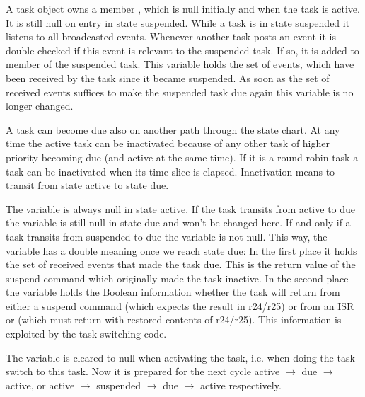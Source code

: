 
A task object owns a member , which is null
initially and when the task is active. It is still null on entry in state
suspended. While a task is in state suspended it listens to all
broadcasted events. Whenever another task posts an event it is
double-checked if this event is relevant to the suspended task. If so, it
is added to member  of the suspended task. This
variable holds the set of events, which have been received by the task
since it became suspended. As soon as the set of received events suffices
to make the suspended task due again this variable is no longer changed.

A task can become due also on another path through the state chart. At any
time the active task can be inactivated because of any other task of
higher priority becoming due (and active at the same time). If it is a
round robin task a task can be inactivated when its time slice is
elapsed. Inactivation means to transit from state active to state due.

The variable  is always null in state active. If the
task transits from active to due the variable is still null in state due
and won't be changed here. If and only if a task transits from suspended
to due the variable is not null. This way, the variable has a double
meaning once we reach state due: In the first place it holds the set of
received events that made the task due. This is the return value of the
suspend command which originally made the task inactive. In the second
place the variable holds the Boolean information whether the task will
return from either a suspend command (which expects the result in r24/r25)
or from an ISR or  (which must return with restored
contents of r24/r25). This information is exploited by the task switching
code.

The variable  is cleared to null when activating the
task, i.e. when doing the task switch to this task. Now it is prepared for
the next cycle active $\rightarrow$ due $\rightarrow$ active, or active
$\rightarrow$ suspended $\rightarrow$ due $\rightarrow$ active
respectively.


